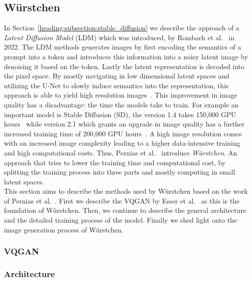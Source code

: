 \subsection{W\"urstchen}
In Section~\ref{heading:subsection:stable_diffusion} we describe the approach
of a \emph{Latent Diffusion Model} (LDM) which was introduced,
by Rombach et al.~\cite{rombach2022stablediffusion} in 2022. The LDM methods
generates images by first encoding the semantics of a prompt into a token and
introduces this information into a noisy latent image by denoising
it based on the token. Lastly the latent representation is decoded into the
pixel space. By mostly navigating in low dimensional latent spaces and
utilizing the U-Net to slowly induce semantics into the representation, this
approach is able to yield high resolution images~\cite{rombach2022stablediffusion}.
This improvement in image quality has a disadvantage: the time the models take
to train. For example an important model is Stable Diffusion (SD), the version
1.4 takes 150,000 GPU hours~\cite{rombach2022sd_1_4} while version 2.1 which
grants an upgrade in image quality has a further increased training time of
200,000 GPU hours~\cite{rombach2023sd_2_1}. A high image resolution comes with
an increased image complexity leading to a higher data-intensive training and
high computational costs. Thus, Pernias et al.~\cite{pernias2024wrstchen}
introduce \emph{W\"urstchen}. An approach that tries to lower the training time
and computational cost, by splitting the training process into three parts and
mostly computing in small latent spaces.\\

This section aims to describe the methods used by W\"urstchen based on the work
of Pernias et al.~\cite{pernias2024wrstchen}. First we describe the VQGAN by
Esser et al.~\cite{esser2021tamingtransformershighresolutionimage} as this is
the foundation of W\"urstchen. Then, we continue to describe the general
architecture and the detailed training process of the model. Finally we shed
light onto the image generation process of W\"urstchen.

\subsubsection{VQGAN}

\subsubsection{Architecture}

